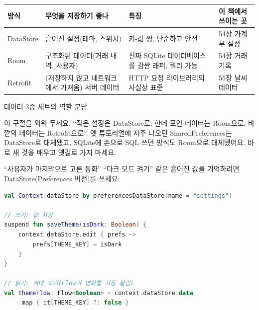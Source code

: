 


\begin{center}
\begin{tabularx}{\linewidth}{|X|X|X|X|}
\hline
\textbf{방식} & \textbf{무엇을 저장하기 좋나} & \textbf{특징} & \textbf{이 책에서 쓰이는 곳} \tabularnewline
\hline
DataStore & 흩어진 설정(테마, 스위치) & 키-값 쌍, 단순하고 안전 & 54장 가계부 설정 \tabularnewline
Room & 구조화된 데이터(거래 내역, 사용자) & 진짜 SQLite 데이터베이스를 감싼 래퍼, 쿼리 가능 & 54장 거래 기록 \tabularnewline
Retrofit & (저장하지 않고 네트워크에서 가져옴) 서버 데이터 & HTTP 요청 라이브러리의 사실상 표준 & 55장 날씨 데이터 \tabularnewline
\hline
\end{tabularx}
\end{center}

\begin{center}\small\color{gray}데이터 3종 세트의 역할 분담\end{center}

이 구절을 외워 두세요. “작은 설정은 DataStore로, 한데 모인 데이터는 Room으로, 바깥의 데이터는 Retrofit으로”. 옛 튜토리얼에 자주 나오던 SharedPreferences는 DataStore로 대체됐고, SQLite에 손으로 SQL 쓰던 방식도 Room으로 대체됐어요. 바로 새 것을 배우고 옛길로 가지 마세요.


“사용자가 마지막으로 고른 통화” “다크 모드 켜기” 같은 흩어진 값을 기억하려면 DataStore(Preferences 버전)를 쓰세요:

\begin{lstlisting}[language=Kotlin]
val Context.dataStore by preferencesDataStore(name = "settings")

// 쓰기: 값 저장
suspend fun saveTheme(isDark: Boolean) {
    context.dataStore.edit { prefs ->
        prefs[THEME_KEY] = isDark
    }
}

// 읽기: 꺼내 오기(Flow가 변화를 자동 알림)
val themeFlow: Flow<Boolean> = context.dataStore.data
    .map { it[THEME_KEY] ?: false }
\end{lstlisting}

